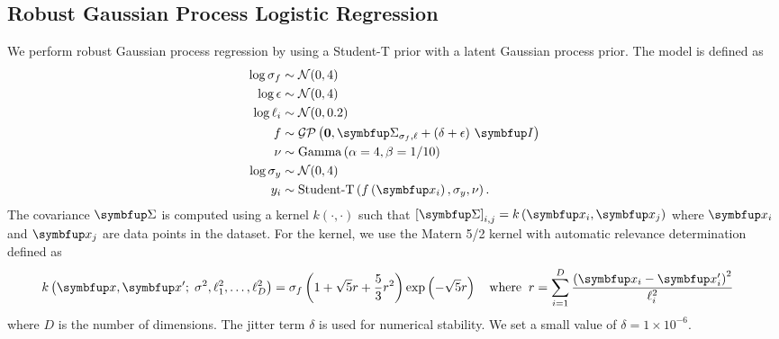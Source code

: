 \subsection{Robust Gaussian Process Logistic Regression}\label{section:rgp}
We perform robust Gaussian process regression by using a Student-T prior with a latent Gaussian process prior.
The model is defined as
\begin{align*}
   \log \sigma_f &\sim \mathcal{N}(0, 4) \\
   \log \epsilon &\sim \mathcal{N}(0, 4) \\
   \log \ell_i   &\sim \mathcal{N}(0, 0.2) \\
   f   &\sim \mathcal{GP}\left(\mathbf{0}, \mSigma_{\sigma_f, \mathbf{\ell}} + \left(\delta + \epsilon\right)\,\mI \right) \\
   \nu &\sim \mathrm{Gamma}\left(\alpha=4, \beta=1/10\right) \\
   \log \sigma_y &\sim \mathcal{N}(0, 4) \\
   y_i &\sim \text{Student-T}\left(  f\left( \vx_i \right), \sigma_y, \nu  \right).
\end{align*}
The covariance \(\mSigma\) is computed using a kernel \(k\left(\cdot, \cdot\right)\) such that \({[\mSigma]}_{i,j} = k\left( \vx_{i}, \vx_{j} \right) \) where \(\vx_i\) and \(\vx_j\) are data points in the dataset.
For the kernel, we use the Matern 5/2 kernel with automatic relevance determination~\citep{neal_bayesian_1996} defined as
\begin{align*}
  &k\left(\vx, \vx' ;\; \sigma^2, \ell^2_1, \ldots, \ell^2_D \right) =
  \sigma_f \left( 1 + \sqrt{5} r + \frac{5}{3} r^2 \right) \exp\left( - \sqrt{5} r \right) \quad
  \text{where}\;\; r = \sum^{D}_{i=1} \frac{ {\left(\vx_i - \vx'_i\right)}^2 }{\ell^2_i}
\end{align*}
where \(D\) is the number of dimensions.
The jitter term \(\delta\) is used for numerical stability.
We set a small value of \(\delta = 1\times10^{-6}\).

